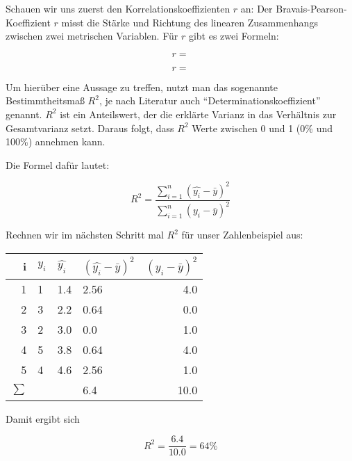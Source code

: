 \documentclass[ngerman, 12pt]{scrartcl}
\begin{document}
Schauen wir uns zuerst den Korrelationskoeffizienten \(r\) an: Der Bravais-Pearson-Koeffizient \(r\) misst die Stärke und Richtung des linearen Zusammenhangs zwischen zwei metrischen Variablen. Für \(r\) gibt es zwei Formeln:

\begin{equation}
r = 
\end{equation}

\begin{equation}
r = 
\end{equation}





Um hierüber eine Aussage zu treffen, nutzt man das sogenannte Bestimmtheitsmaß \(R^2\), je nach Literatur auch \enquote{Determinationskoeffizient} genannt. \(R^2\) ist ein Anteilswert, der die erklärte Varianz in das Verhältnis zur Gesamtvarianz setzt. Daraus folgt, dass \(R^2\) Werte zwischen 0 und 1 (0\% und 100\%) annehmen kann. 

Die Formel dafür lautet:

\begin{equation}
R^2 = \frac{\sum_{i=1}^n (\hat{y_i} - \bar{y})^2} {\sum_{i=1}^n (y_i - \bar{y})^2}
\end{equation}

Rechnen wir im nächsten Schritt mal \(R^2\) für unser Zahlenbeispiel aus:


\begin{center}
\begin{tabular}{r|lllr} \toprule
i & \(y_i\)  & \(\hat{y_i}\) & \((\hat{y_i} - \bar{y})^2 \)&  \((y_i - \bar{y})^2\) \\ \midrule
1 & 1 &  1.4 & 2.56    & 4.0\\
2 & 3 &  2.2 &  0.64 & 0.0\\
3 & 2 &  3.0 & 0.0     & 1.0\\ 
4 & 5 &  3.8 & 0.64    & 4.0\\ 
5 & 4 &  4.6 & 2.56    & 1.0\\ \midrule
\(\sum\) & & & 6.4 & 10.0\\ \bottomrule
\end{tabular}
\end{center}

Damit ergibt sich

\begin{equation}
R^2 = \frac{6.4}{10.0} = 64 \%
\end{equation}
\end{document}
